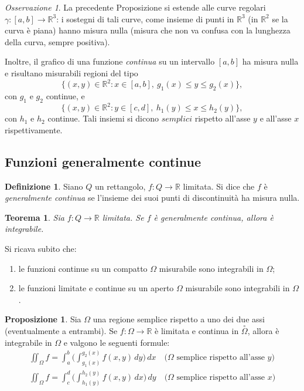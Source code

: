 \documentclass[a4paper]{book}
\numberwithin{equation}{section}
\theoremstyle{plain}
\newtheorem{teor}{Teorema}[section]
\theoremstyle{definition}
\newtheorem{defn}{Definizione}[section]
\newtheorem{prop}{Proposizione}[section]
\theoremstyle{remark}
\newtheorem{oss}{Osservazione}[section]
\theoremstyle{example}
\begin{document}
\begin{oss}
La precedente Proposizione si estende alle curve regolari $\gamma \colon [a, b] \to \mathbb{R}^3$: i sostegni di tali curve, come insieme di punti in $\mathbb{R}^3$ (in $\mathbb{R}^2$ se la curva è piana) hanno misura nulla (misura che non va confusa con la lunghezza della curva, sempre positiva).
\end{oss}

Inoltre, il grafico di una funzione \emph{continua} su un intervallo $[a, b]$ ha misura nulla e risultano misurabili regioni del tipo
	\begin{equation}
	\{(x,y) \in \mathbb{R}^2  \colon x \in [a, b], \ g_1 (x) \le y \le g_2(x)\},
	\end{equation}
con $g_1$ e $g_2$ continue, e
	\begin{equation}
	\{(x,y) \in \mathbb{R}^2 \colon y \in [c,d], \ h_1(y) \le x \le h_2(y) \},
	\end{equation}
con $h_1$ e $h_2$ continue. Tali insiemi si dicono $semplici$ rispetto all'asse $y$ e all'asse $x$ rispettivamente.

\subsection{Funzioni generalmente continue}
\begin{defn}
Siano $Q$ un rettangolo, $f \colon Q \to \mathbb{R}$ limitata. Si dice che $f$ è \emph{generalmente continua} se l'insieme dei suoi punti di discontinuità ha misura nulla.
\end{defn}

\begin{teor}
Sia $f \colon Q \to \mathbb{R}$ limitata. Se $f$ è generalmente continua, allora è integrabile.
\end{teor}

Si ricava subito che:
\begin{enumerate}
\item le funzioni continue su un compatto $\Omega$ misurabile sono integrabili in $\Omega$;
\item le funzioni limitate e continue su un aperto $\Omega$ misurabile sono integrabili in $\Omega$.
\end{enumerate}

\begin{prop}
Sia $\Omega$ una regione semplice rispetto a uno dei due assi (eventualmente a entrambi). Se $f \colon \Omega \to \mathbb{R}$ è limitata e continua in $\overset{\circ}{\Omega}$, allora è integrabile in $\Omega$ e valgono le seguenti formule:
	\begin{align}
	\iint_{\Omega} f = \int_a^b \biggl( \int_{g_1(x)}^{g_2(x)} f(x, y) \, dy \biggr) \, dx \quad \text{($\Omega$ semplice rispetto all'asse $y$)} \\
	\iint_{\Omega} f = \int_c^d \biggl(\int_{h_1(y)}^{h_2(y)} f(x,y) \, dx \biggr) \, dy \quad \text{($\Omega$ semplice rispetto all'asse $x$)}
	\end{align}
\end{prop}
\end{document}
